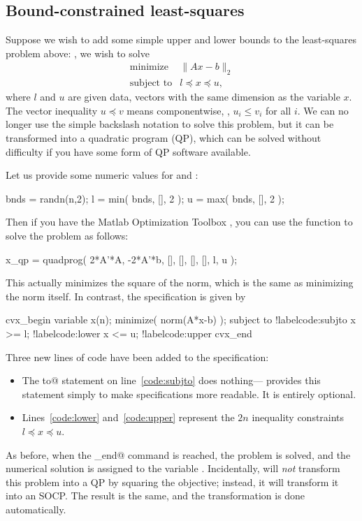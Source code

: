 \documentclass[12pt]{article}
\begin{document}
\subsection{Bound-constrained least-squares}
\label{sec:bcls}
\label{Least squares!Bound-constrained}
\label{Bound-constrained least squares}

Suppose we wish to add some simple upper and
lower bounds to the least-squares problem above: \ie, we wish to solve 
\begin{equation}
\begin{array}{ll}
\mbox{minimize} & \|Ax-b\|_2\\
\mbox{subject to} & l \preceq x \preceq u,
\end{array}
\label{eq:bcls}
\end{equation}
where $l$ and $u$ are given data, vectors with the same dimension
as the variable $x$.
The vector inequality $u \preceq v$ means componentwise, \ie,
$u_i \leq v_i$ for all $i$. We can no longer use the simple
backslash notation to solve this problem, but it can be transformed
into a quadratic program (QP), which can be solved without difficulty
if you have some form
of QP software available. 

Let us provide some numeric values for \verb@l@ and \verb@u@:
\begin{code2}[firstnumber=47]
	bnds = randn(n,2);
	l = min( bnds, [], 2 );
	u = max( bnds, [], 2 );
\end{code2}
Then if you have the Matlab
Optimization Toolbox \cite{MATOPT}, you can use the \verb@quadprog@ function
to solve the problem as follows:
\begin{code2}[firstnumber=53]
	x_qp = quadprog( 2*A'*A, -2*A'*b, [], [], [], [], l, u );
\end{code2}
This actually minimizes the square of the norm, which is the same as
minimizing the norm itself. In contrast, the \cvx specification is given by
\begin{code2}[firstnumber=59]
	cvx_begin
	    variable x(n);
	    minimize( norm(A*x-b) );
	    subject to			!label{code:subjto}
	        x >= l;			!label{code:lower}
	        x <= u;			!label{code:upper}
	cvx_end
\end{code2}
Three new lines of \cvx code have been added to the \cvx specification:
\begin{itemize}
\item The \verb@subject to@ statement on line~\ref{code:subjto} does nothing---\cvx
provides this statement simply to make specifications more readable. 
It is entirely optional.
\item Lines~\ref{code:lower} and~\ref{code:upper}
represent the $2n$ inequality constraints $l \preceq x \preceq u$.
\end{itemize}
As before, when the \verb@cvx_end@ command is reached, the problem
is solved, and the numerical solution is assigned to the variable
\verb@x@. Incidentally, \cvx will 
\emph{not} transform this problem into a QP by squaring the objective;
instead, it will transform it
into an SOCP. The result is the same, and the transformation
is done automatically.
\end{document}
